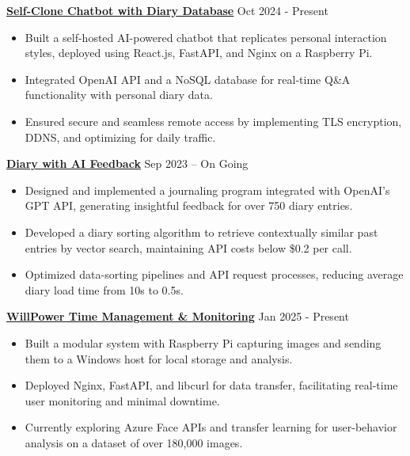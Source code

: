 \documentclass[letterpaper,10pt]{article}
\begin{document}
\vspace{0.2cm}
\noindent\href{https://chengyongkang.me/chat}{\uline{
\textbf{Self-Clone Chatbot with Diary Database}}} \hfill Oct 2024 - Present
\begin{itemize}[leftmargin=0.2in]
    \item Built a self-hosted AI-powered chatbot that replicates personal interaction styles, deployed using React.js, FastAPI, and Nginx on a Raspberry Pi.
    \item Integrated OpenAI API and a NoSQL database for real-time Q\&A functionality with personal diary data.
    \item Ensured secure and seamless remote access by implementing TLS encryption, DDNS, and optimizing for daily traffic.
\end{itemize}

\vspace{0.2cm}
\noindent\href{https://github.com/Ken-2511/Diary-with-ChatGPT-Comment}{\uline{
\textbf{Diary with AI Feedback}}} \hfill Sep 2023 -- On Going
\begin{itemize}[leftmargin=0.2in]
    \item Designed and implemented a journaling program integrated with OpenAI's GPT API, generating insightful feedback for over 750 diary entries.
    \item Developed a diary sorting algorithm to retrieve contextually similar past entries by vector search, maintaining API costs below \$0.2 per call.
    \item Optimized data-sorting pipelines and API request processes, reducing average diary load time from 10s to 0.5s.
\end{itemize}

\vspace{0.2cm}
\noindent\href{https://github.com/Ken-2511/WillPower}{\uline{
\textbf{WillPower \textbar{} Time Management \& Monitoring}}} \hfill Jan 2025 - Present
\begin{itemize}[leftmargin=0.2in]
    \item Built a modular system with Raspberry Pi capturing images and sending them to a Windows host for local storage and analysis.
    \item Deployed Nginx, FastAPI, and libcurl for data transfer, facilitating real-time user monitoring and minimal downtime.
    \item Currently exploring Azure Face APIs and transfer learning for user-behavior analysis on a dataset of over 180,000 images.
\end{itemize}
\end{document}
